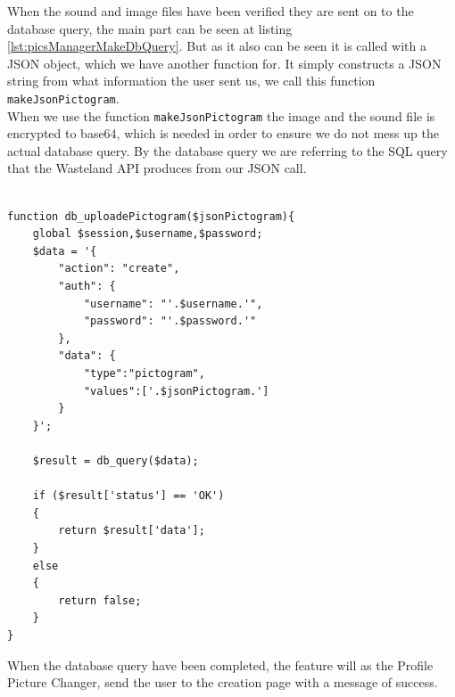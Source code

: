 
When the sound and image files have been verified they are sent on to the database query, the main part can be seen at listing \ref{lst:picsManagerMakeDbQuery}. But as it also can be seen it is called with a JSON object, which we have another function for. It simply constructs a JSON string from what information the user sent us, we call this function \texttt{makeJsonPictogram}.\\
When we use the function \texttt{makeJsonPictogram} the image and the sound file is encrypted to base64, which is needed in order to ensure we do not mess up the actual database query. By the database query we are referring to the SQL query that the Wasteland API produces from our JSON call.\\
\\

\lstset{language=PHP}
\begin{lstlisting}[firstline=1,caption={The main part of the DB query for creating Pictograms},label=lst:picsManagerMakeDbQuery]
function db_uploadePictogram($jsonPictogram){
	global $session,$username,$password;
	$data = '{
		"action": "create",
		"auth": {
			"username": "'.$username.'",
			"password": "'.$password.'"
		},
	    "data": {
	    	"type":"pictogram",
	    	"values":['.$jsonPictogram.']
	    }
	}';
	
	$result = db_query($data);

	if ($result['status'] == 'OK')
	{
		return $result['data'];
	}
	else
	{
		return false;
	}
}
\end{lstlisting}

When the database query have been completed, the feature will as the Profile Picture Changer, send the user to the creation page with a message of success.\\
\\